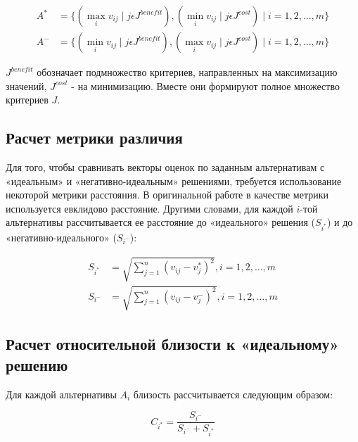 \documentclass{article}
\begin{document}
        \begin{equation}
            \begin{split}
                A^{*} & = \{ (\max_{i} v_{ij} \mid j \epsilon J^{benefit}),
                (\min_{i} v_{ij} \mid j \epsilon J^{cost}) \mid i = 1, 2, \dots, m\} \\
                A^{-} & = \{ (\min_{i} v_{ij} \mid j \epsilon J^{benefit}),
                (\max_{i} v_{ij} \mid j \epsilon J^{cost}) \mid i = 1, 2, \dots, m\}
            \end{split}
        \end{equation}

        \(J^{benefit}\) обозначает подмножество критериев, направленных на максимизацию
        значений, \(J^{cost}\) - на минимизацию. Вместе они формируют полное множество
        критериев \(J\).

    \subsection{Расчет метрики различия}
        Для того, чтобы сравнивать векторы оценок по заданным альтернативам с «идеальным» и
        «негативно-идеальным» решениями, требуется использование некоторой метрики расстояния.
        В оригинальной работе в качестве метрики используется евклидово расстояние.
        Другими словами, для каждой
        \(i\)-той альтернативы рассчитывается ее расстояние до «идеального» решения
        (\(S_{i^{*}}\)) и до «негативно-идеального» (\(S_{i^{-}}\)):

        \begin{equation}
            \begin{split}
                S_{i^{*}} & = \sqrt{\sum_{j=1}^{n}{(v_{ij} - v_{j}^{*})^2}},
                i = 1, 2, \dots, m \\
                S_{i^{-}} & = \sqrt{\sum_{j=1}^{n}{(v_{ij} - v_{j}^{-})^2}},
                i = 1, 2, \dots, m
            \end{split}
        \end{equation}

    \subsection{Расчет относительной близости к «идеальному» решению}
        Для каждой альтернативы \(A_i\) близость рассчитывается следующим образом:

        \begin{equation}
            C_{i^{*}} = \frac{S_{i^{-}}}{S_{i^{-}} + S_{i^{*}}}
        \end{equation}
\end{document}
